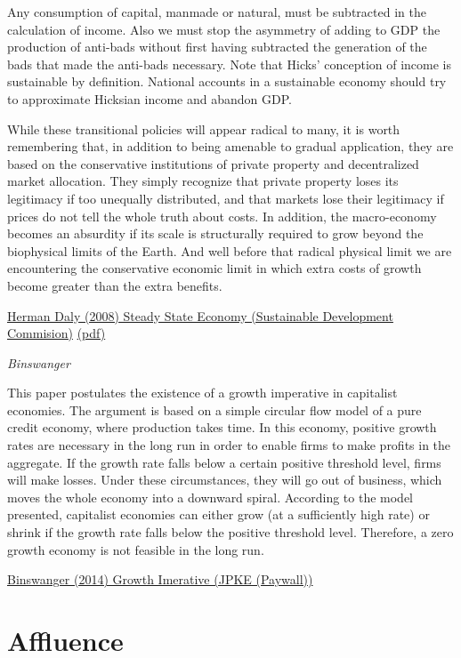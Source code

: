 \documentclass[
]{book}
\begin{document}
Any consumption of capital, manmade or natural, must be subtracted in the calculation of income. Also we
must stop the asymmetry of adding to GDP the production of anti-bads without first having subtracted the generation
of the bads that made the anti-bads necessary. Note that Hicks' conception of income is sustainable by definition.
National accounts in a sustainable economy should try to approximate Hicksian income and abandon GDP.

While these transitional policies will appear radical to many, it is worth remembering that, in addition to being
amenable to gradual application, they are based on the conservative institutions of private property and decentralized
market allocation. They simply recognize that private property loses its legitimacy if too unequally distributed, and
that markets lose their legitimacy if prices do not tell the whole truth about costs. In addition, the macro-economy
becomes an absurdity if its scale is structurally required to grow beyond the biophysical limits of the Earth. And well
before that radical physical limit we are encountering the conservative economic limit in which extra costs of growth
become greater than the extra benefits.

\href{http://www.sd-commission.org.uk/publications.php@id=775.html}{Herman Daly (2008) Steady State Economy (Sustainable Development Commision)}
\href{pdf/Daly_2008_Steady_State_Economy_SD_Commision.pdf}{(pdf)}

\emph{Binswanger}

This paper postulates the existence of a growth imperative in capitalist economies. The argument is based on a simple circular flow model of a pure credit economy, where production takes time. In this economy, positive growth rates are necessary in the long run in order to enable firms to make profits in the aggregate. If the growth rate falls below a certain positive threshold level, firms will make losses. Under these circumstances, they will go out of business, which moves the whole economy into a downward spiral. According to the model presented, capitalist economies can either grow (at a sufficiently high rate) or shrink if the growth rate falls below the positive threshold level. Therefore, a zero growth economy is not feasible in the long run.

\href{https://www.tandfonline.com/doi/abs/10.2753/PKE0160-3477310410}{Binswanger (2014) Growth Imerative (JPKE (Paywall))}

\hypertarget{affluence}{%
\chapter{Affluence}\label{affluence}}
\end{document}
